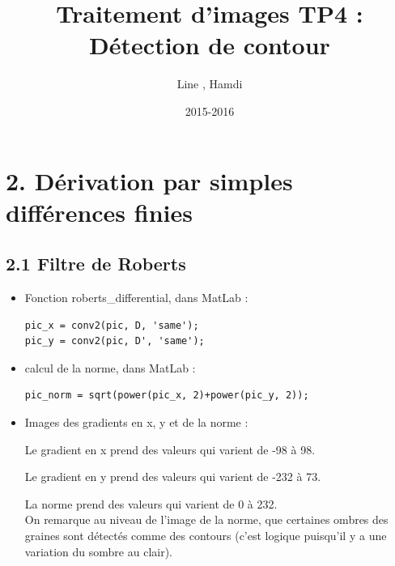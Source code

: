 \documentclass{article}
\title{\textbf{Traitement d'images TP4 : Détection de contour}}
\author{Line \bsc{POUVARET}, Hamdi \bsc{BENAOUN}}
\date{2015-2016}
\begin{document}
\maketitle

\section*{2. Dérivation par simples différences finies}
\subsection*{2.1 Filtre de Roberts}
\begin{itemize}\renewcommand{\labelitemi}{$\bullet$}
	\item Fonction roberts\_differential, dans MatLab :
	
\begin{lstlisting}
pic_x = conv2(pic, D, 'same');
pic_y = conv2(pic, D', 'same');
\end{lstlisting}

	\item calcul de la norme, dans MatLab :
\begin{lstlisting}
pic_norm = sqrt(power(pic_x, 2)+power(pic_y, 2));
\end{lstlisting}
	\item Images des gradients en x, y et de la norme :
	
\begin{center}
\end{center}

Le gradient en x prend des valeurs qui varient de -98 à 98.

Le gradient en y prend des valeurs qui varient de -232 à 73.

La norme prend des valeurs qui varient de 0 à 232.\\

On remarque au niveau de l'image de la norme, que certaines ombres des graines sont détectés comme des contours (c'est logique puisqu'il y a une variation du sombre au clair).

\end{itemize}
\end{document}
